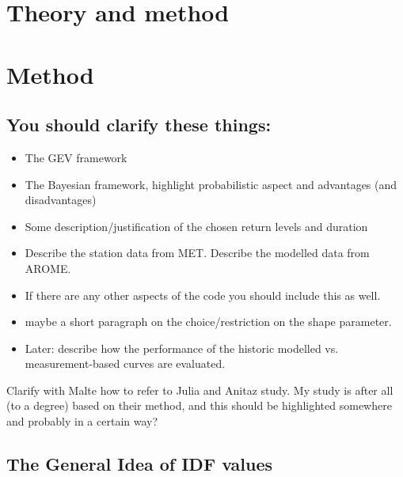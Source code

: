 \section{Theory and method}
\label{sec:theory}

\section{Method}
\subsection{You should clarify these things:}

\begin{itemize}
\item The GEV framework 
\item The Bayesian framework, highlight probabilistic aspect and advantages (and disadvantages)
\item Some description/justification of the chosen return levels and duration
\item Describe the station data from MET. Describe the modelled data from AROME. 
\item If there are any other aspects of the code you should include this as well.
\item maybe a short paragraph on the choice/restriction on the shape parameter. 
\item Later: describe how the performance of the historic modelled vs. measurement-based curves are evaluated. 
\end{itemize}

Clarify with Malte how to refer to Julia and Anitaz study. My study is after all (to a degree) based on their method, and this should be highlighted somewhere and probably in a certain way?

\subsection{The General Idea of IDF values} 


